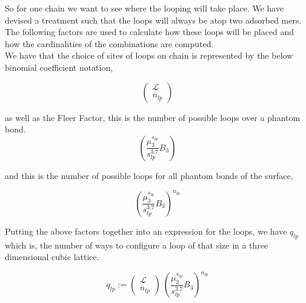 \documentclass[12pt,letterpaper]{article}
\newcommand{\leng}{\mathcal{L}}
\newcommand{\lr}[1]{\left( #1 \right)}
\begin{document}
So for one chain we want to see where the looping will take place. We have devised a treatment such that the loops will always be atop two adsorbed mers. The following factors are used to calculate how these loops will be placed and how the cardinalities of the combinations are computed.\\



We have that the choice of sites of loops on chain is represented by the below binomial coefficient notation,

\begin{equation}
\lr{
\begin{array}{c}
     \leng\\
     n_{lp} 
\end{array}
}
\label{eq.looploc}
\end{equation}

as well as the Fleer Factor, this is the number of possible loops over a phantom bond.
\begin{equation}
    \lr{
        \frac{
            \mu_3^{
                s_{lp}
            }
        }{
            s_{lp}^{3.7}
        }
        B_3
    }
\label{FleerFactor}
\end{equation}

and this is the number of possible loops for all phantom bonds of the surface,

\begin{equation}
    \lr{
        \frac{
            \mu_3^{
                s_{lp}
            }
        }{
            s_{lp}^{3.7}
        }
        B_3
    }
    ^{
        n_{lp}            
    }
\label{FleerFactor}
\end{equation}

Putting the above factors together
into an expression for the loops, we have $q_{lp}$ which is, the number of ways to configure a loop of that size in a three dimensional cubic lattice.


\begin{equation}
    q_{lp}
    := 
    \lr{
    \begin{array}{c}
         \leng\\
         n_{lp} 
    \end{array}
    }   
    ~
    \lr{
                \frac{
                    \mu_3^{
                        s_{lp}
                    }
                }{
                    s_{lp}^{3.7}
                }
                B_3
            }
            ^{
                n_{lp}            
    }
\label{refEnum}
\end{equation}
\end{document}
